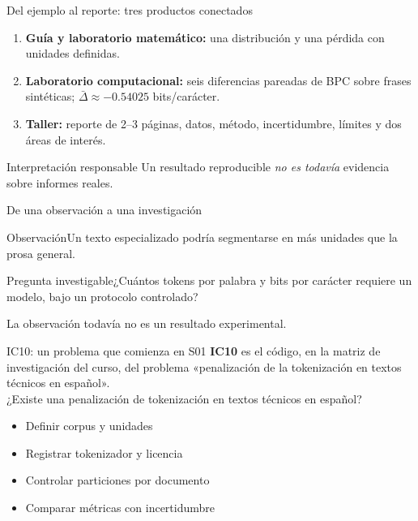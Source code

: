 \documentclass[aspectratio=169,10pt]{beamer}
\begin{document}
\begin{frame}{Del ejemplo al reporte: tres productos conectados}
\begin{enumerate}
\item \textbf{Guía y laboratorio matemático:} una distribución y una pérdida con unidades definidas.
\item \textbf{Laboratorio computacional:} seis diferencias pareadas de BPC sobre frases sintéticas; $\bar\Delta\approx-0.54025$ bits/carácter.
\item \textbf{Taller:} reporte de 2--3 páginas, datos, método, incertidumbre, límites y dos áreas de interés.
\end{enumerate}
\begin{block}{Interpretación responsable}
\centering Un resultado reproducible \emph{no es todavía} evidencia sobre informes reales.
\end{block}
\end{frame}

\begin{frame}{De una observación a una investigación}
\begin{block}{Observación}\large Un texto especializado podría segmentarse en más unidades que la prosa general.\end{block}
\begin{block}{Pregunta investigable}\large ¿Cuántos tokens por palabra y bits por carácter requiere un modelo, bajo un protocolo controlado?\end{block}
\small La observación todavía no es un resultado experimental.
\end{frame}

\begin{frame}{IC10: un problema que comienza en S01}
\small\textbf{IC10} es el código, en la matriz de investigación del curso, del problema «penalización de la tokenización en textos técnicos en español».\\[3mm]
\centering\Large ¿Existe una penalización de tokenización en textos técnicos en español?\\[5mm]
\normalsize\begin{itemize}\item Definir corpus y unidades\item Registrar tokenizador y licencia\item Controlar particiones por documento\item Comparar métricas con incertidumbre\end{itemize}
\end{frame}
\end{document}
